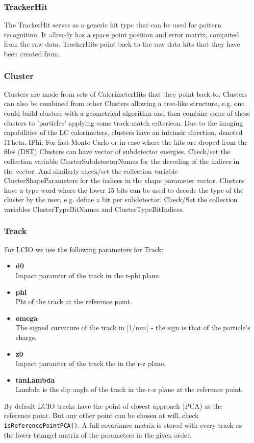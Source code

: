 \documentclass[twoside]{article}
\begin{document}
\subsubsection{TrackerHit}
The TrackerHit serves as a generic hit type that can be used for pattern recognition. It allready has a space 
point position and error matrix, computed from the raw data. TrackerHits point back to the raw data hits that they
have been created from.

\subsubsection{Cluster}
Clusters are made from sets of CalorimeterHits that they point back to. Clusters can also be combined from other
Clusters allowing a tree-like structure, e.g. one could build clusters with a geometrical algorithm and then
combine some of these clusters to 'particles' applying some track-match criterieon. Due to the imaging capabilities
of the LC calorimeters, clusters have an intrinsic direction, denoted ITheta, IPhi. For fast Monte Carlo or in case
where the hits are droped from the files (DST) Clusters can have vector of subdetector energies. Check/set the 
collection variable ClusterSubdetectorNames for the decoding of the indices in the vector.
And similarly check/set the collection variable ClusterShapeParameters for the indices in the shape parameter 
vector. Clusters have a type word where the lower 15 bits can be used to decode the type of the cluster by the
user, e.g. define a bit per subdetector. Check/Set the collection variables ClusterTypeBitNames and 
ClusterTypeBitIndices.



\subsubsection{Track}
For LCIO we use the following parameters for Track:
\begin{itemize}
\item{{\bf d0}\\
Impact paramter of the track in the r-phi plane.}
\item{{\bf phi}\\
Phi of the track at the reference point.}
\item{{\bf omega}\\
The signed curvature of the track in [1/mm] - the sign is that of the particle's charge.
}
\item{{\bf z0}\\
Impact paramter of the track the in the r-z plane.
}
\item{{\bf tanLambda}\\
Lambda is the dip angle of the track in the r-z plane at the reference point. 
}
\end{itemize}
By default LCIO tracks have the point of closest approach (PCA) as the reference point. But any other point can 
be chosen at will, check \verb$isReferencePointPCA()$.  A full covariance matrix is stored with every track as the
lower triangel matrix of the parameters in the given order.
\end{document}
